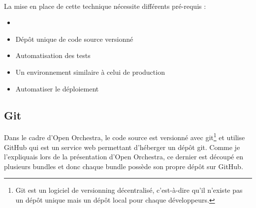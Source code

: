 \paragraph{}
La mise en place de cette technique nécessite différents pré-requis : 
\begin{itemize}
\item[]
\item Dépôt unique de code source versionné
\item Automatisation des tests
\item Un environnement similaire à celui de production
\item Automatiser le déploiement
\end{itemize}

\subsection{Git}
Dans le cadre d'Open Orchestra, le code source est versionné avec git\footnote{Git est un logiciel de versionning décentralisé, c'est-à-dire qu'il n'existe pas un dépôt unique mais un dépôt local pour chaque développeurs.} et utilise GitHub qui est un service web permettant d'héberger un dépôt git. Comme je l'expliquais lors de la présentation d'Open Orchestra, ce dernier est découpé en plusieurs bundles et donc chaque bundle possède son propre dépôt sur GitHub.
